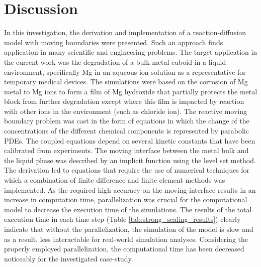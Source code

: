 \section{Discussion}

In this investigation, the derivation and implementation of a reaction-diffusion model with moving boundaries were presented. Such an approach finds application in many scientific and engineering problems. The target application in the current work was the degradation of a bulk metal cuboid in a liquid environment, specifically Mg in an aqueous ion solution as a representative for temporary medical devices. The simulations were based on the corrosion of Mg metal to Mg ions to form a film of Mg hydroxide that partially protects the metal block from further degradation except where this film is impacted by reaction with other ions in the environment (such as chloride ion). The reactive moving boundary problem was cast in the form of equations in which the change of the concentrations of the different chemical components is represented by parabolic {PDE}s. The coupled equations depend on several kinetic constants that have been calibrated from experiments. The moving interface between the metal bulk and the liquid phase was described by an implicit function using the level set method. The derivation led to equations that require the use of numerical techniques for which a combination of finite difference and finite element methods was implemented. As the required high accuracy on the moving interface results in an increase in computation time, parallelization was crucial for the computational model to decrease the execution time of the simulations. The results of the total execution time in each time step (Table \ref{tab:strong_scaling_results}) clearly indicate that without the parallelization, the simulation of the model is slow and as a result, less interactable for real-world simulation analyses. Considering the properly employed parallelization, the computational time has been decreased noticeably for the investigated case-study.

